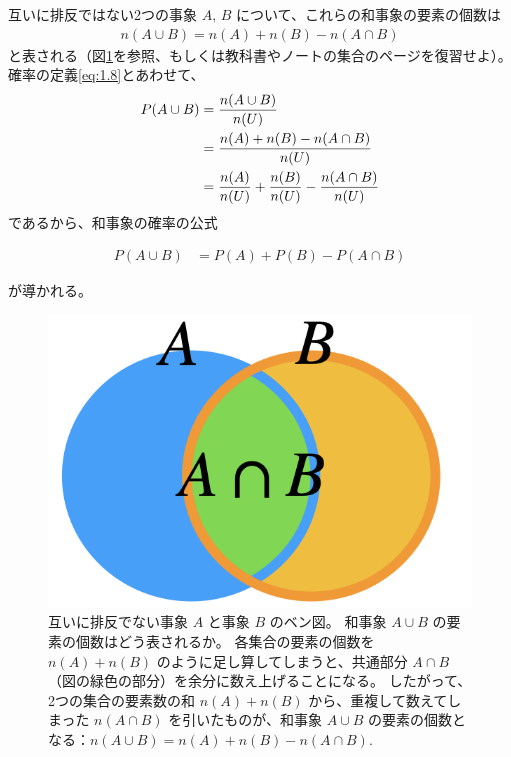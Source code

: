 \documentclass[12pt]{ltjsarticle}\usepackage{ifthen}\newcounter{enlarge}\setcounter{enlarge}{1}
\begin{document}
互いに排反ではない2つの事象 $A,\, B$ について、これらの和事象の要素の個数は
\begin{align}
  n(A \cup B) = n(A) + n(B) - n(A \cap B) \label{eq:2.1}
\end{align}
と表される（図\ref{f:2.1}を参照、もしくは教科書やノートの集合のページを復習せよ）。
確率の定義\eqref{eq:1.8}とあわせて、
\begin{align}
  P(A \cup B) &= \frac{n(A \cup B)}{n(U)} \notag \\
              &= \frac{n(A) + n(B) - n(A \cap B)}{n(U)} \notag \\
              &= \frac{n(A)}{n(U)} + \frac{n(B)}{n(U)} - \frac{n(A \cap B)}{n(U)}
\end{align}
であるから、和事象の確率の公式
\begin{oframed}
  \begin{align}
    P(A \cup B) &= P(A) + P(B) - P(A \cap B) \label{eq:2.2}
  \end{align}
\end{oframed}
\noindent
が導かれる。

\begin{figure}[] 
\centering 
\includegraphics[width=6truecm]{./figure/f2-1.png}
\captionsetup{width=.9\linewidth}
\caption{%
  互いに排反でない事象 $A$ と事象 $B$ のベン図。
  和事象 $A \cup B$ の要素の個数はどう表されるか。
  各集合の要素の個数を $n(A) + n(B)$ のように足し算してしまうと、共通部分 $A \cap B$ （図の緑色の部分）を余分に数え上げることになる。
  したがって、2つの集合の要素数の和 $n(A) + n(B)$ から、重複して数えてしまった $n(A \cap B)$ を引いたものが、和事象 $A \cup B$ の要素の個数となる：$n(A \cup B) = n(A) + n(B) - n(A \cap B)$.
}
\label{f:2.1}
\end{figure}
\end{document}
